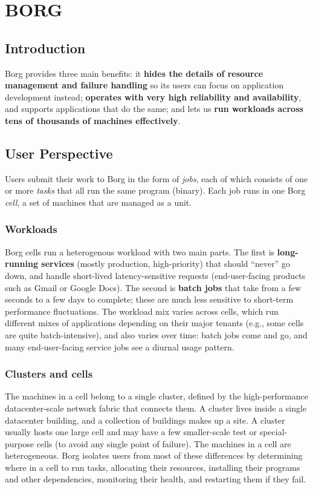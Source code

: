 \section{BORG}
	\subsection{Introduction}
	Borg provides three main benefits: it \textbf{hides the details
	of resource management and failure handling} so its users can
	focus on application development instead; \textbf{operates with very high reliability and availability}, and supports applications that do the same; and lets us \textbf{run workloads across
	tens of thousands of machines effectively}.
	
	\subsection{User Perspective}
	Users submit their work to Borg	in the form of \textit{jobs}, each of which consists of one or more
	\textit{tasks} that all run the same program (binary). Each job runs in one Borg \textit{cell}, a set of machines that are managed as a
	unit.
		\subsubsection{Workloads}
		Borg cells run a heterogenous workload with two main parts.\newline
		The first is \textbf{long-running services} (mostly production, high-priority) that should “never” go down, and handle short-lived latency-sensitive requests (end-user-facing products such as Gmail or Google Docs).\newline
		The second is \textbf{batch jobs} that take from a few seconds to a few days to complete; these are much less sensitive to short-term performance fluctuations.\newline
		\newline
		The workload mix varies across cells, which run different mixes of applications depending on their major tenants (e.g., some cells are quite batch-intensive), and also varies over time: batch jobs come and go, and many end-user-facing service jobs see a	diurnal usage pattern. 
		\subsubsection{Clusters and cells}
		The machines in a cell belong to a single cluster, defined by the high-performance datacenter-scale network fabric that connects them.\newline
		A cluster lives inside a single datacenter building, and a collection of buildings makes up a site. A cluster usually hosts one large cell and may have a few	smaller-scale test or special-purpose cells (to avoid any single point of failure).\newline
		\newline
		The machines in a cell are heterogeneous. Borg isolates	users from most of these differences by determining	where in a cell to run tasks, allocating their resources, installing their programs and other dependencies, monitoring	their health, and restarting them if they fail.
